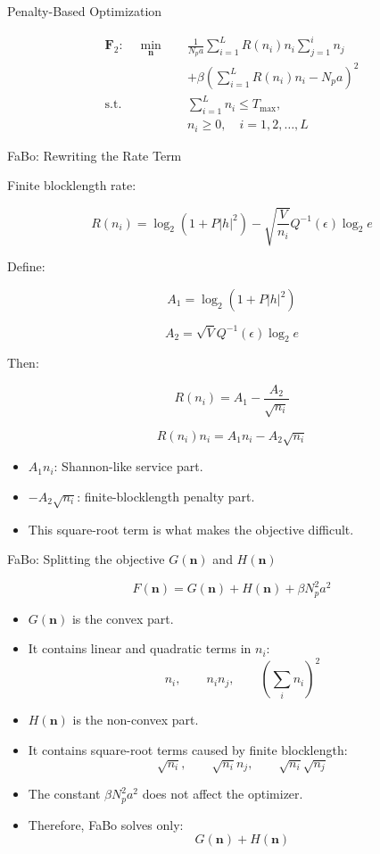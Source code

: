 \documentclass{beamer}
\begin{document}
\begin{frame}{Penalty-Based Optimization}
\small

\[
\begin{aligned}
\mathbf{F}_2:\quad
\min_{\mathbf{n}} \quad
& \frac{1}{N_pa}
\sum_{i=1}^{L}R(n_i)n_i\sum_{j=1}^{i}n_j \\
& +\beta
\left(
\sum_{i=1}^{L}R(n_i)n_i-N_pa
\right)^2 \\[0.1cm]
\text{s.t.}\quad
& \sum_{i=1}^{L}n_i\leq T_{\max},\\
& n_i\geq0,\quad i=1,2,\ldots,L
\end{aligned}
\]

\end{frame}

\begin{frame}{FaBo: Rewriting the Rate Term}
\small

Finite blocklength rate:

\[
R(n_i)
=
\log_2(1+P|h|^2)
-
\sqrt{\frac{V}{n_i}}Q^{-1}(\epsilon)\log_2 e
\]

Define:

\[
A_1=\log_2(1+P|h|^2)
\]

\[
A_2=\sqrt{V}Q^{-1}(\epsilon)\log_2 e
\]

Then:

\[
R(n_i)
=
A_1-\frac{A_2}{\sqrt{n_i}}
\]

\[
R(n_i)n_i
=
A_1n_i-A_2\sqrt{n_i}
\]

\begin{itemize}
    \item $A_1n_i$: Shannon-like service part.
    \item $-A_2\sqrt{n_i}$: finite-blocklength penalty part.
    \item This square-root term is what makes the objective difficult.
\end{itemize}

\end{frame}

\begin{frame}{FaBo: Splitting the objective $G(\mathbf{n})$ and $H(\mathbf{n})$}
\small

\[
F(\mathbf{n})
=
G(\mathbf{n})+H(\mathbf{n})+\beta N_p^2a^2
\]

\begin{itemize}
    \item $G(\mathbf{n})$ is the convex part.
    \item It contains linear and quadratic terms in $n_i$:
    \[
    n_i,\qquad n_in_j,\qquad
    \left(\sum_i n_i\right)^2
    \]

    \item $H(\mathbf{n})$ is the non-convex part.
    \item It contains square-root terms caused by finite blocklength:
    \[
    \sqrt{n_i},\qquad \sqrt{n_i}n_j,\qquad \sqrt{n_i}\sqrt{n_j}
    \]

    \item The constant $\beta N_p^2a^2$ does not affect the optimizer.
    \item Therefore, FaBo solves only:
    \[
    G(\mathbf{n})+H(\mathbf{n})
    \]
\end{itemize}

\end{frame}
\end{document}
